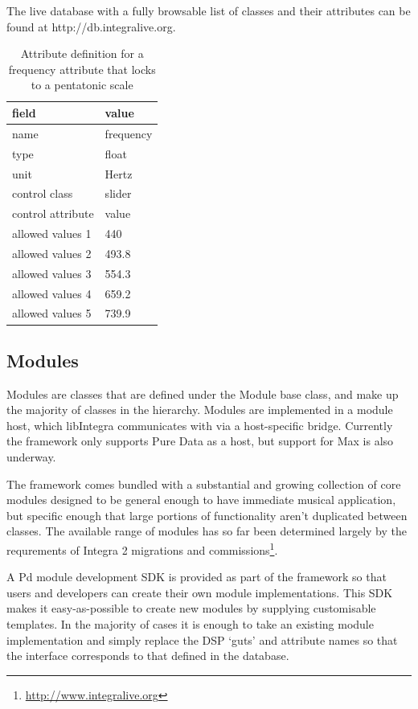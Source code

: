 \documentclass[twoside,10pt,a4paper]{article}
\begin{document}
The live database with a fully browsable list of classes and their attributes can be found at http://db.integralive.org.

\begin{table}[htbp]
\begin{center}
\begin{tabular}{|l|l|}
\hline
field & value \\
\hline
name  & frequency \\
type & float \\
unit & Hertz \\
control class & slider \\
control attribute & value \\
allowed values 1 & 440 \\
allowed values 2 & 493.8 \\
allowed values 3 & 554.3 \\
allowed values 4 & 659.2 \\
allowed values 5 & 739.9 \\
\hline
\end{tabular}
\end{center}
\caption{Attribute definition for a frequency attribute that locks to a pentatonic scale}
\label{tab:example}
\end{table}


\subsection{Modules}

Modules are classes that are defined under the Module base class, and make up the majority of classes in the hierarchy. Modules are implemented in a module host, which libIntegra communicates with via a host-specific bridge\cite{Bullock:03}. Currently the framework only supports Pure Data as a host, but support for Max is also underway. 

The framework comes bundled with a substantial and growing collection of core modules designed to be general enough to have immediate musical application, but specific enough that large portions of functionality aren't duplicated between classes. The available range of modules has so far been determined largely by the requrements of Integra 2 migrations and commissions\footnote{\href{http://www.integralive.org}{http://www.integralive.org}}.

A Pd module development SDK is provided as part of the framework so that users and developers can create their own module implementations. This SDK makes it easy-as-possible to create new modules by supplying customisable templates. In the majority of cases it is enough to take an existing module implementation and simply replace the DSP `guts' and attribute names so that the interface corresponds to that defined in the database.
\end{document}
